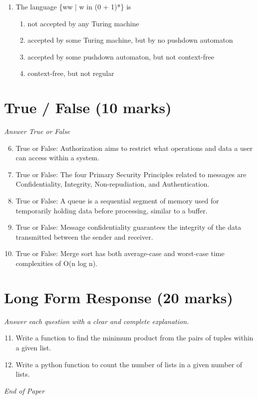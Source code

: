 \documentclass[12pt]{article}
\begin{document}
\begin{enumerate}[label=\arabic*.]
\begin{enumerate}[label=(\alph*)]
    \item Enigma, a transposition cipher
    \item One-time pad
\end{enumerate}
\item The language \{ww | w in (0 + 1)*\} is
\begin{enumerate}[label=(\alph*)]
    \item not accepted by any Turing machine
    \item accepted by some Turing machine, but by no pushdown automaton
    \item accepted by some pushdown automaton, but not context-free
    \item context-free, but not regular
\end{enumerate}
\end{enumerate}

\section*{True / False (10 marks)}
\textit{Answer True or False}
\begin{enumerate}[label=\arabic*.]
\setcounter{enumi}{5}
\item True or False: Authorization aims to restrict what operations and data a user can access within a system.
\item True or False: The four Primary Security Principles related to messages are Confidentiality, Integrity, Non-repudiation, and Authentication.
\item True or False: A queue is a sequential segment of memory used for temporarily holding data before processing, similar to a buffer.
\item True or False: Message confidentiality guarantees the integrity of the data transmitted between the sender and receiver.
\item True or False: Merge sort has both average-case and worst-case time complexities of O(n log n).
\end{enumerate}

\section*{Long Form Response (20 marks)}
\textit{Answer each question with a clear and complete explanation.}
\begin{enumerate}[label=\arabic*.]
\setcounter{enumi}{10}
\item Write a function to find the minimum product from the pairs of tuples within a given list.
\item Write a python function to count the number of lists in a given number of lists.
\end{enumerate}

\vfill
\noindent\textit{End of Paper}
\end{document}
